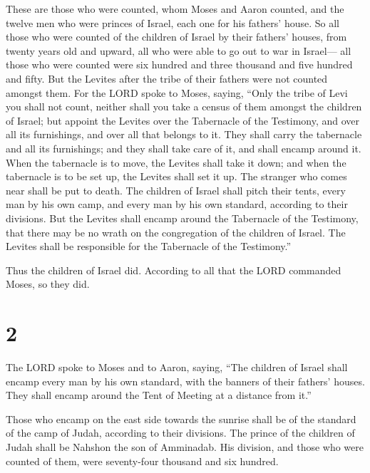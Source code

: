  These are those who were counted, whom Moses and Aaron
counted, and the twelve men who were princes of Israel, each one for his
fathers' house.  So all those who were counted of the
children of Israel by their fathers' houses, from twenty years old and
upward, all who were able to go out to war in Israel--- 
all those who were counted were six hundred and three thousand and five
hundred and fifty.  But the Levites after the tribe of
their fathers were not counted amongst them.  For the LORD
spoke to Moses, saying,  ``Only the tribe of Levi you shall
not count, neither shall you take a census of them amongst the children
of Israel;  but appoint the Levites over the Tabernacle of
the Testimony, and over all its furnishings, and over all that belongs
to it. They shall carry the tabernacle and all its furnishings; and they
shall take care of it, and shall encamp around it.  When
the tabernacle is to move, the Levites shall take it down; and when the
tabernacle is to be set up, the Levites shall set it up. The stranger
who comes near shall be put to death.  The children of
Israel shall pitch their tents, every man by his own camp, and every man
by his own standard, according to their divisions.  But the
Levites shall encamp around the Tabernacle of the Testimony, that there
may be no wrath on the congregation of the children of Israel. The
Levites shall be responsible for the Tabernacle of the Testimony.''

 Thus the children of Israel did. According to all that the
LORD commanded Moses, so they did.

\hypertarget{section-1}{%
\section{2}\label{section-1}}

 The LORD spoke to Moses and to Aaron, saying, 
``The children of Israel shall encamp every man by his own standard,
with the banners of their fathers' houses. They shall encamp around the
Tent of Meeting at a distance from it.''

 Those who encamp on the east side towards the sunrise shall
be of the standard of the camp of Judah, according to their divisions.
The prince of the children of Judah shall be Nahshon the son of
Amminadab.  His division, and those who were counted of
them, were seventy-four thousand and six hundred.

